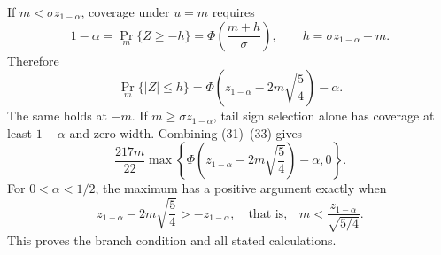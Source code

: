 If \(m<\sigma z_{1-\alpha}\), coverage under \(u=m\) requires
\[
 1-\alpha=\Pr_m\{Z\geq-h\}
 =\Phi\!\left(\frac{m+h}{\sigma}\right),\qquad
 h=\sigma z_{1-\alpha}-m.
\tag{32}
\]
Therefore
\[
 \Pr_m\{|Z|\leq h\}
 =\Phi\!\left(z_{1-\alpha}-2m\sqrt{\frac54}\right)-\alpha.
\tag{33}
\]
The same holds at \(-m\).  If \(m\geq\sigma z_{1-\alpha}\), tail sign selection alone has coverage at least \(1-\alpha\) and zero width.  Combining (31)--(33) gives
\[
 \frac{217m}{22}
 \max\!\left\{
 \Phi\!\left(z_{1-\alpha}-2m\sqrt{\frac54}\right)-\alpha,0
 \right\}.
\tag{34}
\]
For \(0<\alpha<1/2\), the maximum has a positive argument exactly when
\[
 z_{1-\alpha}-2m\sqrt{\frac54}>-z_{1-\alpha},
 \quad\text{that is,}\quad
 m<\frac{z_{1-\alpha}}{\sqrt{5/4}}.
\]
This proves the branch condition and all stated calculations.

